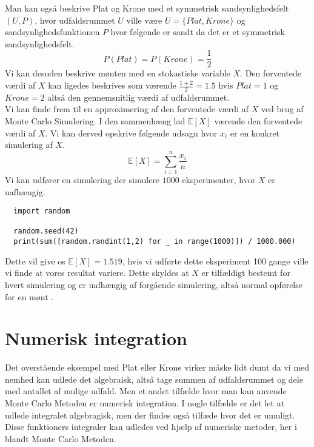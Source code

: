 \documentclass[../../SRP.tex]{subfiles}
\begin{document}
Man kan også beskrive Plat og Krone med et symmetrisk sandsynlighedsfelt $(U, P)$, hvor udfaldsrummet $U$ ville være $U = \{Plat, Krone\}$ og sandsynlighedsfunktionen $P$ hvor følgende er sandt da det er et symmetrisk sandsynlighedsfelt.
\begin{equation}
  P(Plat) = P(Krone) = \frac{1}{2}
\end{equation}
Vi kan desuden beskrive mønten med en stokastiske variable $X$. Den forventede værdi af $X$ kan ligedes beskrives som værende $\frac{1 + 2}{2} = 1.5$ hvis $Plat = 1$ og $Krone = 2$ altså den gennemsnitlig værdi af udfaldsrummet. \\

Vi kan finde frem til en approximering af den forventede værdi af $X$ ved brug af Monte Carlo Simulering. I den sammenhæng lad $\mathbb{E}[X]$ værende den forventede værdi af $X$. Vi kan derved opskrive følgende udsagn hvor $x_i$ er en konkret simulering af $X$.
\begin{equation}
  \mathbb{E}[X] = \sum\limits_{i=1}^n\frac{x_i}{n}
\end{equation}
Vi kan udfører en simulering der simulere $1000$ eksperimenter, hvor $X$ er uafhængig.
\begin{lstlisting}
  import random

  random.seed(42)
  print(sum([random.randint(1,2) for _ in range(1000)]) / 1000.000)
\end{lstlisting}
Dette vil give os $\mathbb{E}[X] = 1.519$, hvis vi udførte dette eksperiment 100 gange ville vi finde at vores resultat variere. Dette skyldes at $X$ er tilfældigt bestemt for hvert simulering og er uafhængig af forgående simulering, altså normal opførelse for en mønt \cite{NM}. \\

\section{Numerisk integration}

Det overstående eksempel med Plat eller Krone virker måske lidt dumt da vi med nemhed kan udlede det algebraisk, altså tage summen af udfaldsrummet og dele med antallet af mulige udfald. Men et andet tilfælde hvor man kan anvende Monte Carlo Metoden er numerisk integration. I nogle tilfælde er det let at udlede integralet algebragisk, men der findes også tilfæde hvor det er umuligt. Disse funktioners integraler kan udledes ved hjælp af numeriske metoder, her i blandt Monte Carlo Metoden. \\
\end{document}
